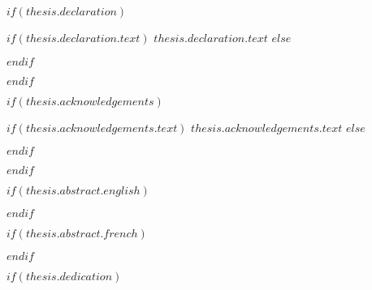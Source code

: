 $if(thesis.declaration)$
\begin{declaration}
\addchaptertocentry{\authorshipname} %
$if(thesis.declaration.text)$
$thesis.declaration.text$
$else$

$endif$
\end{declaration}
$endif$

$if(thesis.acknowledgements)$

\begin{acknowledgements}
\addchaptertocentry{\acknowledgementname} %
$if(thesis.acknowledgements.text)$
$thesis.acknowledgements.text$
$else$

$endif$
\end{acknowledgements}
$endif$


$if(thesis.abstract.english)$
\begin{abstract}
\addchaptertocentry{\abstractname} %
$if(thesis.abstract.english.text)$
$thesis.abstract.english.text$
$else$

$endif$
\end{abstract}
$endif$

$if(thesis.abstract.french)$
\renewcommand{\abstractname}{Résumé}
\begin{abstract}
\addchaptertocentry{\abstractname}
$if(thesis.abstract.french.text)$
$thesis.abstract.french.text$
$else$

$endif$
\end{abstract}
\renewcommand{\abstractname}{Abstract} %
$endif$

$if(thesis.dedication)$

